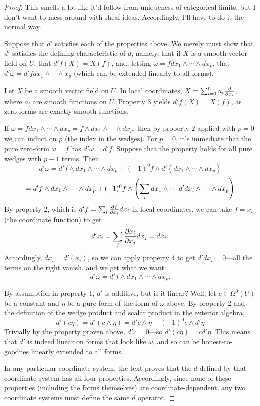 \documentclass{article}
\begin{document}
\begin{proof}
  This smells a lot like it'd follow from uniqueness of categorical limits, but I don't want to mess around with sheaf ideas.
  Accordingly, I'll have to do it the normal way.

  Suppose that  $d'$ satisfies each of the properties above.
  We merely must show that $d'$ satisfies the defining characteristic of $d$, namely, that if $X$ is a smooth vector field
  on $U$, that $d'f(X) = X(f)$, and, letting $\omega = fdx_{1} \wedge \cdots \wedge dx_{p}$,
  that $d'\omega = d'fdx_{1} \wedge \cdots \wedge x_{p}$ (which can be extended linearly to all forms).

  Let $X$ be a smooth vector field on $U$.
  In local coordinates, $X = \sum_{i = 1}^{n}a_{i}\pdv{x_{i}}$, where $a_{i}$ are smooth functions on $U$.
  Property 3 yields $d'f(X) = X(f)$, as zero-forms are exactly smooth functions.

  If $\omega = fdx_{1} \wedge \cdots \wedge dx_{p} = f \wedge dx_{1} \wedge \cdots \wedge dx_{p}$, then by property 2
  applied with $p = 0$ we can induct on $p$ (the index in the wedges).
  For $p = 0$, it's immediate that the pure zero-form $\omega = f$ has $d'\omega = d'f$.
  Suppose that the property holds for all pure wedges with $p - 1$ terms.
  Then
  \[
    d'\omega = d'f \wedge dx_{1} \wedge \cdots \wedge dx_{p} + (-1)^{0}f \wedge d'(dx_{1} \wedge \cdots \wedge dx_{p})
  \]
  \[
    = d'f \wedge dx_{1} \wedge \cdots \wedge dx_{p} + (-1)^{0}f \wedge \qty(\sum_{i}dx_{1} \wedge \cdots d'dx_{i} \wedge \cdots \wedge dx_{p})
  \]
  By property 2, which is $d'f = \sum_{i}\pdv{f}{x_{i}}dx_{i}$ in local coordinates, we can take $f = x_{i}$ (the coordinate function) to get
  \[
    d'x_{i} = \sum_{j}\pdv{x_{i}}{x_{j}}dx_{j} = dx_{i}.
  \]
  Accordingly, $dx_{i} = d'(x_{i})$, so we can apply property 4 to get $d'dx_{i} = 0$---all the terms on the right vanish,
  and we get what we want:
  \[
    d'\omega = d'f \wedge dx_{1} \wedge \cdots \wedge dx_{p}.
  \]

  By assumption in property 1, $d'$ is additive, but is it linear?
  Well, let $c \in \Omega^{0}(U)$ be a constant and $\eta$ be a pure form of the form of $\omega$ above.
  By property 2 and the definition of the wedge product and scalar product in the exterior algebra,
  \[
    d'(c\eta) = d'(c \wedge \eta) = d'c \wedge \eta + (-1)^{0}c \wedge d'\eta
  \]
  Trivially by the property proven above, $d'c = 0$---so $d'(c\eta) = cd'\eta$.
  This means that $d'$ is indeed linear on forms that look like $\omega$, and so can be honest-to-goodnes linearly extended to all forms.

  In any particular coordinate system, the text proves that the $d$ defined by that coordinate system has all four properties.
  Accordingly, since none of these properties (including the forms themselves) are coordinate-dependent,
  any two coordinate systems must define the same $d$ operator.
\end{proof}
\end{document}
